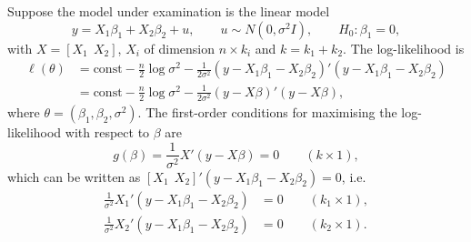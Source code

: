 \documentclass[11pt]{article}
\begin{document}
Suppose the model under examination is the linear model
\[ y=X_{1}\beta_{1}+X_{2}\beta_{2}+u,\qquad u\sim N(0,\sigma^{2}I),\qquad H_{0}\colon\beta_{1}=0, \]
with $X=[X_{1}\ \ X_{2}]$, $X_{i}$ of dimension $n\times k_{i}$ and $k=k_{1}+k_{2}$. The log-likelihood is
\begin{align*}
 \ell(\theta)&=\text{const}-\frac n2\log\sigma^{2}-\frac1{2\sigma^{2}}(y-X_{1}\beta_{1}-X_{2}\beta_{2})'(y-X_{1}\beta_{1}-X_{2}\beta_{2})\\
 &=\text{const}-\frac n2\log\sigma^{2}-\frac1{2\sigma^{2}}(y-X\beta)'(y-X\beta),
\end{align*}
where $\theta=(\beta_{1},\beta_{2},\sigma^{2})$. The first-order conditions for maximising the
log-likelihood with respect to $\beta$ are
\begin{equation}\tag{E1}
 g(\beta)=\frac1{\sigma^{2}}X'(y-X\beta)=0\qquad(k\times1),
\end{equation}
which can be written as $[X_{1}\ \ X_{2}]'(y-X_{1}\beta_{1}-X_{2}\beta_{2})=0$, i.e.
\begin{align}
 \tfrac1{\sigma^{2}}X_{1}'(y-X_{1}\beta_{1}-X_{2}\beta_{2})&=0\qquad(k_{1}\times1), \tag{E2}\\
 \tfrac1{\sigma^{2}}X_{2}'(y-X_{1}\beta_{1}-X_{2}\beta_{2})&=0\qquad(k_{2}\times1). \tag{E3}
\end{align}
\end{document}
